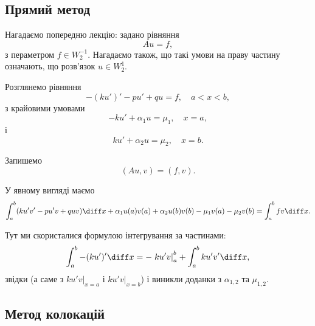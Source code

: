 \subsection{Прямий метод}

Нагадаємо попередню лекцію: задано рівняння
\begin{equation}
    \label{eq:2.1.1}
    A u = f,
\end{equation}
з пераметром $f \in W_2^{-1}$. Нагадаємо також, що такі умови на праву частину означають, що розв'язок $u \in W_2^1$.

\begin{example}
    Розглянемо рівняння
    \begin{equation}
        \label{eq:2.1.2}
        -(ku')' - pu' + qu = f, \quad a < x < b,
    \end{equation}
    з крайовими умовами
    \begin{equation}
        \label{eq:2.1.3}
        -ku' + \alpha_1 u = \mu_1, \quad x = a,
    \end{equation}
    і
    \begin{equation}
        \label{eq:2.1.4}
        ku' + \alpha_2 u = \mu_2, \quad x = b.
    \end{equation}
\end{example}
\begin{solution}
    Запишемо
    \begin{equation*}
        (A u, v) = (f, v).
    \end{equation*}

    У явному вигляді маємо
    \begin{equation}
        \label{eq:2.1.5}
        \int_a^b (k u' v' - p u' v + q u v) \diff x + \alpha_1 u(a) v(a) + \alpha_2 u(b) v(b) - \mu_1 v(a) - \mu_2 v(b) = \int_a^b f v \diff x.
    \end{equation}
    
    Тут ми скористалися формулою інтегрування за частинами:
    \begin{equation*}
        \int_a^b -(k u')' \diff x = - \left. k u' v \right|_a^b + \int_a^b k u' v' \diff x,
    \end{equation*}
    звідки (а саме з $ku'v|_{x=a}$ і $ku'v|_{x=b}$) і виникли доданки з $\alpha_{1,2}$ та $\mu_{1,2}$.
\end{solution}

\subsection{Метод колокацій}

